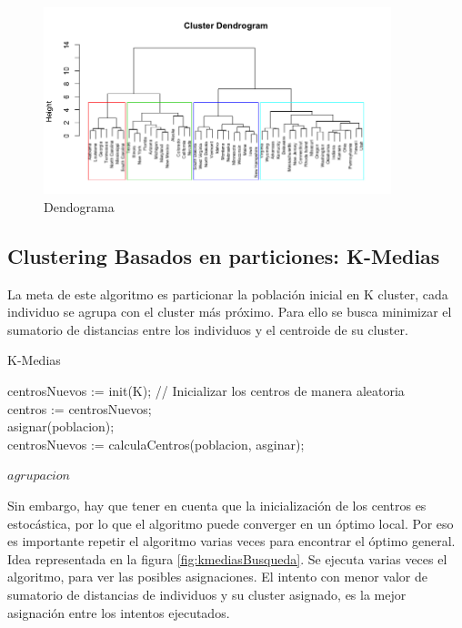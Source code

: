\begin{figure}[!h]
	\centering
	\includegraphics[width=0.9\textwidth]{images/chapter_2/dendograma}
	\caption{Dendograma}
	\label{fig:dendograma}
\end{figure}


\subsection{Clustering Basados en particiones: K-Medias}

La meta de este algoritmo es particionar la población inicial en K cluster, cada individuo se agrupa con el cluster más próximo. Para ello se busca minimizar el sumatorio de distancias entre los individuos y el centroide de su cluster. 


\begin{algorithm}[!h]
	\caption{K-Medias}
	centrosNuevos := init(K); // Inicializar los centros de manera aleatoria\\
	centros := centrosNuevos;\\
	{
		asignar(poblacion);\\
		centrosNuevos := calculaCentros(poblacion, asginar);		
	}
	
	
	\Return $agrupacion$\;
\end{algorithm}

Sin embargo, hay que tener en cuenta que la inicialización de los centros es estocástica, por lo que el algoritmo puede converger en un óptimo local. Por eso es importante repetir el algoritmo varias veces para encontrar el óptimo general. Idea representada en la figura \ref{fig:kmediasBusqueda}. Se ejecuta varias veces el algoritmo, para ver las posibles asignaciones. El intento con menor valor de sumatorio de distancias de individuos y su cluster asignado, es la mejor asignación entre los intentos ejecutados.



